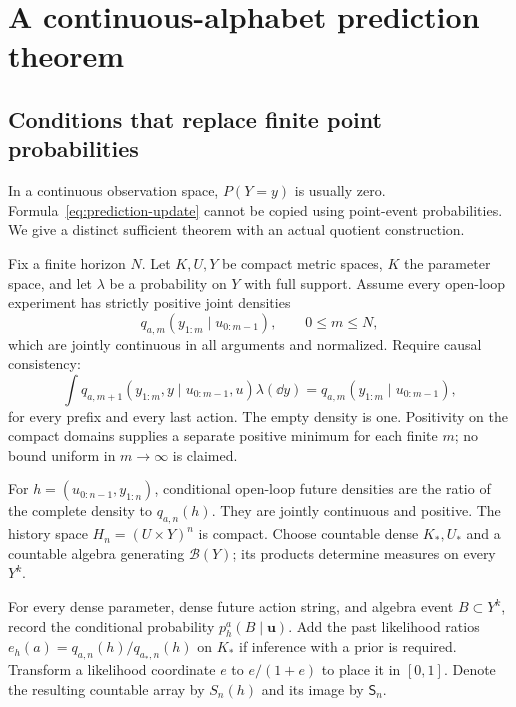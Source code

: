 \section{A continuous-alphabet prediction theorem}\label{sec:continuous}
\subsection{Conditions that replace finite point probabilities}
In a continuous observation space, $P(Y=y)$ is usually zero. Formula~\eqref{eq:prediction-update} cannot be copied using point-event probabilities. We give a distinct sufficient theorem with an actual quotient construction.

Fix a finite horizon $N$. Let $K,U,Y$ be compact metric spaces, $K$ the parameter space, and let $\lambda$ be a probability on $Y$ with full support. Assume every open-loop experiment has strictly positive joint densities
\[
 q_{a,m}(y_{1:m}\mid u_{0:m-1}),\qquad 0\le m\le N,
\]
which are jointly continuous in all arguments and normalized. Require causal consistency:
\begin{equation}
 \int q_{a,m+1}(y_{1:m},y\mid u_{0:m-1},u)\lambda(\dd y)
 =q_{a,m}(y_{1:m}\mid u_{0:m-1}),
 \label{eq:density-consistency}
\end{equation}
for every prefix and every last action. The empty density is one. Positivity on the compact domains supplies a separate positive minimum for each finite $m$; no bound uniform in $m\to\infty$ is claimed.

For $h=(u_{0:n-1},y_{1:n})$, conditional open-loop future densities are the ratio of the complete density to $q_{a,n}(h)$. They are jointly continuous and positive. The history space $H_n=(U\times Y)^n$ is compact. Choose countable dense $K_*,U_*$ and a countable algebra generating $\mathcal B(Y)$; its products determine measures on every $Y^k$.

For every dense parameter, dense future action string, and algebra event $B\subset Y^k$, record the conditional probability $p_h^a(B\mid\mathbf u)$. Add the past likelihood ratios $e_h(a)=q_{a,n}(h)/q_{a_*,n}(h)$ on $K_*$ if inference with a prior is required. Transform a likelihood coordinate $e$ to $e/(1+e)$ to place it in $[0,1]$. Denote the resulting countable array by $S_n(h)$ and its image by $\mathsf S_n$.

